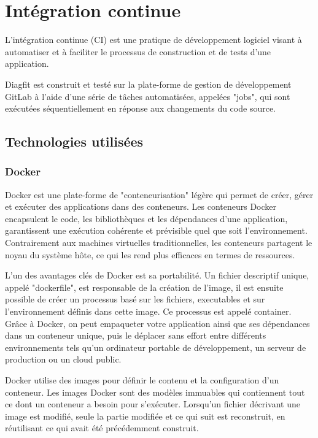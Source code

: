 \newpage
\section{Intégration continue}
L'intégration continue (CI) est une pratique de développement logiciel visant à automatiser et à faciliter le processus de construction et de tests d'une application.

Diagfit est construit et testé sur la plate-forme de gestion de développement GitLab à l'aide d'une série de tâches automatisées, appelées "jobs", qui sont exécutées séquentiellement en réponse aux changements du code source.


\subsection{Technologies utilisées}
\subsubsection{Docker}
Docker est une plate-forme de "conteneurisation" légère qui permet de créer, gérer et exécuter des applications dans des conteneurs.
Les conteneurs Docker encapsulent le code, les bibliothèques et les dépendances d'une application, garantissent une exécution cohérente et prévisible quel que soit l'environnement.
Contrairement aux machines virtuelles traditionnelles, les conteneurs partagent le noyau du système hôte, ce qui les rend plus efficaces en termes de ressources.

L'un des avantages clés de Docker est sa portabilité.
Un fichier descriptif unique, appelé "dockerfile", est responsable de la création de l'image, il est ensuite possible de créer un processus basé sur les fichiers, executables et sur l'environnement définis dans cette image.
Ce processus est appelé container.
Grâce à Docker, on peut empaqueter votre application ainsi que ses dépendances dans un conteneur unique, puis le déplacer sans effort entre différents environnements tels qu'un ordinateur portable de développement, un serveur de production ou un cloud public.

Docker utilise des images pour définir le contenu et la configuration d'un conteneur.
Les images Docker sont des modèles immuables qui contiennent tout ce dont un conteneur a besoin pour s'exécuter.
Lorsqu'un fichier décrivant une image est modifié, seule la partie modifiée et ce qui suit est reconstruit, en réutilisant ce qui avait été précédemment construit.

